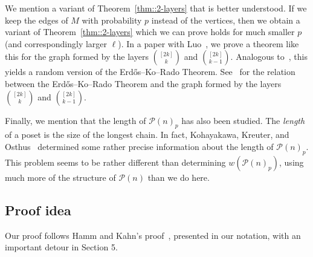 \documentclass[12pt]{article}
\renewcommand{\P}{\mathcal{P}}
\begin{document}
We mention a variant of Theorem~\ref{thm::2-layers} that is better understood. If we keep the edges of $M$ with probability $p$ instead of the vertices, then we obtain a variant of Theorem~\ref{thm::2-layers} which we can prove holds for much smaller $p$ (and correspondingly larger $\ell$). In a paper with Luo~\cite{BKL}, we prove a theorem like this for the graph formed by the layers $\binom{[2k]}{k}$ and $\binom{[2k]}{k-1}$. Analogous to~\cite{HK2}, this yields a random version of the Erd\H{o}s--Ko--Rado Theorem. See~\cite{BKL,HK2} for the relation between the Erd\H{o}s--Ko--Rado Theorem and the graph formed by the layers $\binom{[2k]}{k}$ and $\binom{[2k]}{k-1}$.

Finally, we mention that the length of $\P(n)_p$ has also been studied. The \emph{length} of a poset is the size of the longest chain. In fact, Kohayakawa, Kreuter, and Osthus~\cite{KKO} determined some rather precise information about the length of $\P(n)_p$. This problem seems to be rather different than determining $w(\P(n)_p)$, using much more of the structure of $\P(n)$ than we do here.


\subsection{Proof idea}\label{sec::intro:idea}

Our proof follows Hamm and Kahn's proof~\cite{HK2}, presented in our notation, with an important detour in Section 5.
\end{document}

